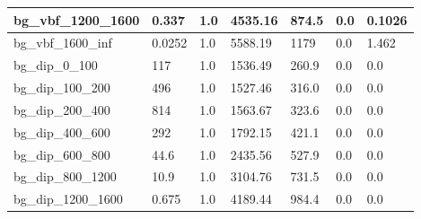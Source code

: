 \documentclass[a4paper, 10pt]{article}
\begin{document}
\begin{table}[H]
\begin{center}
\begin{tabular}{|m{23.0mm}|m{23.0mm}|m{18.0mm}|m{19.0mm}|m{19.0mm}|m{19.0mm}|m{19.0mm}|}
      \hline
      {\cellcolor{white}         bg\_vbf\_1200\_1600}& {\cellcolor{white}         0.337}& {\cellcolor{white}         1.0}& {\cellcolor{white}         4535.16}& {\cellcolor{white}         874.5}& {\cellcolor{green}         0.0}& {\cellcolor{green}         0.1026}\\
      \hline
      {\cellcolor{white}         bg\_vbf\_1600\_inf}& {\cellcolor{white}         0.0252}& {\cellcolor{white}         1.0}& {\cellcolor{white}         5588.19}& {\cellcolor{white}         1179}& {\cellcolor{green}         0.0}& {\cellcolor{green}         1.462}\\
      \hline
      {\cellcolor{white}         bg\_dip\_0\_100}& {\cellcolor{white}         117}& {\cellcolor{white}         1.0}& {\cellcolor{white}         1536.49}& {\cellcolor{white}         260.9}& {\cellcolor{green}         0.0}& {\cellcolor{green}         0.0}\\
      \hline
      {\cellcolor{white}         bg\_dip\_100\_200}& {\cellcolor{white}         496}& {\cellcolor{white}         1.0}& {\cellcolor{white}         1527.46}& {\cellcolor{white}         316.0}& {\cellcolor{green}         0.0}& {\cellcolor{green}         0.0}\\
      \hline
      {\cellcolor{white}         bg\_dip\_200\_400}& {\cellcolor{white}         814}& {\cellcolor{white}         1.0}& {\cellcolor{white}         1563.67}& {\cellcolor{white}         323.6}& {\cellcolor{green}         0.0}& {\cellcolor{green}         0.0}\\
      \hline
      {\cellcolor{white}         bg\_dip\_400\_600}& {\cellcolor{white}         292}& {\cellcolor{white}         1.0}& {\cellcolor{white}         1792.15}& {\cellcolor{white}         421.1}& {\cellcolor{green}         0.0}& {\cellcolor{green}         0.0}\\
      \hline
      {\cellcolor{white}         bg\_dip\_600\_800}& {\cellcolor{white}         44.6}& {\cellcolor{white}         1.0}& {\cellcolor{white}         2435.56}& {\cellcolor{white}         527.9}& {\cellcolor{green}         0.0}& {\cellcolor{green}         0.0}\\
      \hline
      {\cellcolor{white}         bg\_dip\_800\_1200}& {\cellcolor{white}         10.9}& {\cellcolor{white}         1.0}& {\cellcolor{white}         3104.76}& {\cellcolor{white}         731.5}& {\cellcolor{green}         0.0}& {\cellcolor{green}         0.0}\\
      \hline
      {\cellcolor{white}         bg\_dip\_1200\_1600}& {\cellcolor{white}         0.675}& {\cellcolor{white}         1.0}& {\cellcolor{white}         4189.44}& {\cellcolor{white}         984.4}& {\cellcolor{green}         0.0}& {\cellcolor{green}         0.0}\\

\end{tabular}
\end{center}
\end{table}
\end{document}
